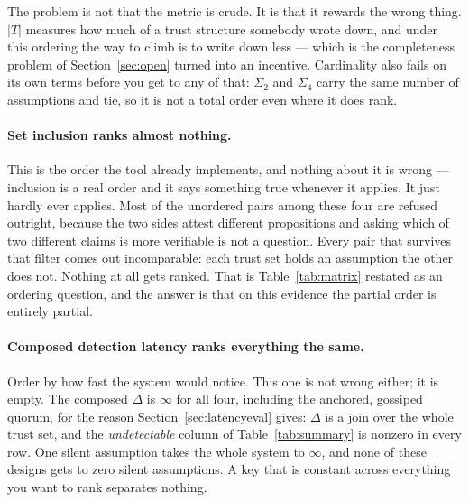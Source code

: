 \documentclass[11pt]{article}
\newcommand{\Never}{\infty}
\begin{document}
The problem is not that the metric is crude. It is that it rewards the wrong
thing. $|T|$ measures how much of a trust structure somebody wrote down, and
under this ordering the way to climb is to write down less --- which is the
completeness problem of Section~\ref{sec:open} turned into an incentive.
Cardinality also fails on its own terms before you get to any of that:
$\Sigma_2$ and $\Sigma_4$ carry the same number of assumptions and tie, so
it is not a total order even where it does rank.

\paragraph{Set inclusion ranks almost nothing.} This is the order the tool
already implements, and nothing about it is wrong ---
inclusion is a real order and it says something true whenever it applies. It
just hardly ever applies. Most of the unordered pairs among these four are
refused outright, because the two sides attest different propositions and
asking which of two different claims is more verifiable is not a question.
Every pair that survives that filter comes out incomparable: each trust set
holds an assumption the other does not. Nothing at all gets ranked. That is
Table~\ref{tab:matrix} restated as an ordering question, and the answer is
that on this evidence the partial order is entirely partial.

\paragraph{Composed detection latency ranks everything the same.} Order by
how fast the system would notice. This one is not wrong either; it is empty.
The composed $\Delta$ is $\Never$ for all four, including the anchored,
gossiped quorum, for the reason Section~\ref{sec:latencyeval} gives: $\Delta$
is a join over the whole trust set, and the \emph{undetectable} column of
Table~\ref{tab:summary} is nonzero in every row. One silent assumption takes
the whole system to $\Never$, and none of these designs gets to zero silent
assumptions. A key that is constant across everything you want to rank
separates nothing.
\end{document}
